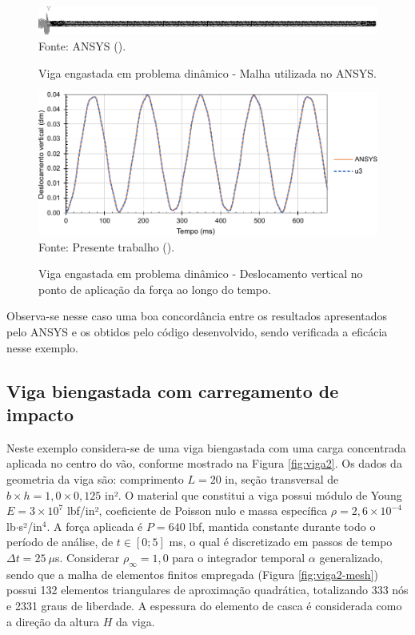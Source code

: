 \begin{figure}[h!]
    \centering
    \caption{Viga engastada em problema dinâmico - Malha utilizada no ANSYS.}
    \includegraphics[width=\linewidth]{Figuras/vigas/ANSYSmesh1.png}
    \\Fonte: ANSYS (\the\year).
    \label{fig:beamANSYS1}
\end{figure}

\begin{figure}[h!]
    \centering
    \caption{Viga engastada em problema dinâmico - Deslocamento vertical no ponto de aplicação da força ao longo do tempo.}
    \includegraphics[width=.8\linewidth]{Figuras/vigas/res1.pdf}
    \\Fonte: Presente trabalho (\the\year).
    \label{fig:res-viga1}
\end{figure}

Observa-se nesse caso uma boa concordância entre os resultados apresentados pelo ANSYS e os obtidos pelo código desenvolvido, sendo verificada a eficácia nesse exemplo.

\subsection{Viga biengastada com carregamento de impacto} \label{Ap:DinBeam2}

Neste exemplo considera-se de uma viga biengastada com uma carga concentrada aplicada no centro do vão, conforme mostrado na Figura \ref{fig:viga2}. Os dados da geometria da viga são: comprimento $L=20$ in, seção transversal de $b\times h=1,0\times0,125$ in². O material que constitui a viga possui módulo de Young $E=3\times10^{7}$ lbf/in², coeficiente de Poisson nulo e massa específica $\rho=2,6\times10^{-4}$ lb$\cdot$s²/in$^4$. A força aplicada é $P=640$ lbf, mantida constante durante todo o período de análise, de $t\in[0;5]$ ms, o qual é discretizado em passos de tempo $\Delta t=25\ \mu$s. Considerar $\rho_\infty=1,0$ para o integrador temporal $\alpha$ generalizado, sendo que a malha de elementos finitos empregada (Figura \ref{fig:viga2-mesh}) possui 132 elementos triangulares de aproximação quadrática, totalizando 333 nós e 2331 graus de liberdade. A espessura do elemento de casca é considerada como a direção da altura $H$ da viga.

